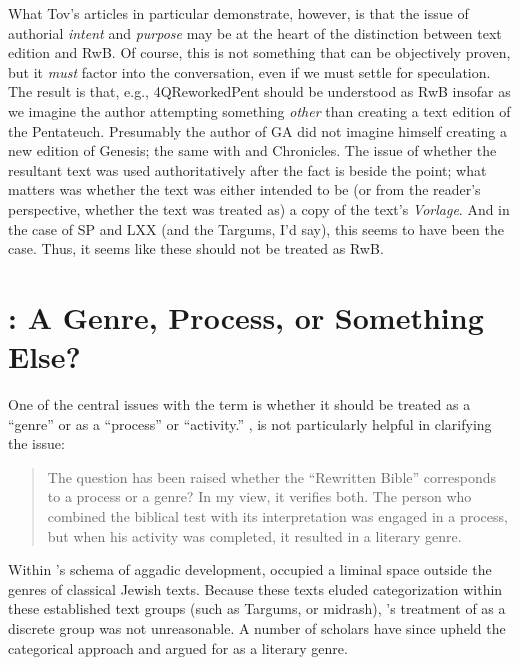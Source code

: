  What Tov's articles in particular demonstrate, however, is that the issue of authorial \emph{intent} and \emph{purpose} may be at the heart of the distinction between text edition and RwB. Of course, this is not something that can be objectively proven, but it \emph{must} factor into the conversation, even if we must settle for speculation. The result is that, e.g., 4QReworkedPent should be understood as RwB insofar as we imagine the author attempting something \emph{other} than creating a text edition of the Pentateuch. Presumably the author of GA did not imagine himself creating a new edition of Genesis; the same with \jub and Chronicles. The issue of whether the resultant text was used authoritatively after the fact is beside the point; what matters was whether the text was either intended to be (or from the reader's perspective, whether the text was treated as) a copy of the text's \emph{Vorlage}. And in the case of SP and LXX (and the Targums, I'd say), this seems to have been the case. Thus, it seems like these should not be treated as RwB. 

 \hypertarget{rwb-a-genre-process-or-something-else}{%
\section{\RWB: A Genre, Process, or Something Else?}\label{rwb-a-genre-process-or-something-else}} 

 One of the central issues with the term \RwB is whether it should be treated as a ``genre'' or as a ``process'' or ``activity.'' \vermes, is not particularly helpful in clarifying the issue: 

 \begin{quote} The question has been raised whether the ``Rewritten Bible'' corresponds to a process or a genre? In my view, it verifies both. The person who combined the biblical test with its interpretation was engaged in a process, but when his activity was completed, it resulted in a literary genre.\autocite[8]{vermes_zsengeller2014} \end{quote} 

 Within \vermes's schema of aggadic development, \rwb occupied a liminal space outside the genres of classical Jewish texts. Because these texts eluded categorization within these established text groups (such as Targums, or midrash), \vermes's treatment of \rwb as a discrete group was not unreasonable. A number of scholars have since upheld the categorical approach and argued for \rwb as a literary genre. 

